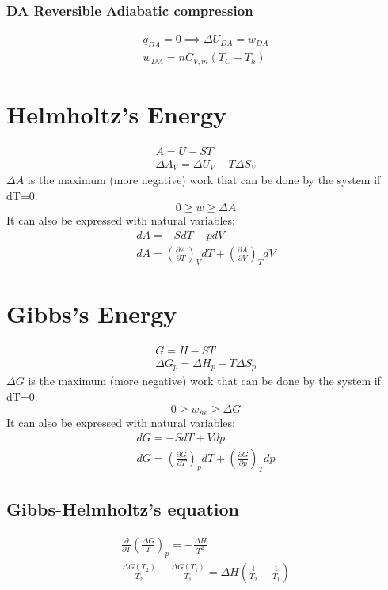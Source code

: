 \documentclass[Master.tex]{subfiles}
\begin{document}
\begin{multicols}{2}
				   \subsubsection{DA Reversible Adiabatic compression}
						    \begin{gather*}
								     q_{DA} = 0 \implies \Delta U_{DA} = w_{DA}\\
								     w_{DA} = nC_{V,m}(T_{C}-T_{h})
						    \end{gather*}

		 \section{Helmholtz's Energy}
		  \begin{gather*}
				   A = U - ST \\
				   \Delta A_{V}  = \Delta U_{V}  - T \Delta S_{V}
		  \end{gather*}
		  $\Delta A$ is the maximum (more negative) work that can be done by the system if dT=0.
		  $$ 0 \geq w \geq \Delta A $$
		  It can also be expressed with natural variables:
		  \begin{gather*}
				   dA = -SdT - pdV \\
				   dA = \left(\frac{\partial A}{\partial T}\right)_{V} dT + \left(\frac{\partial A}{\partial V}\right) _{T}dV
		  \end{gather*}

		 \section{Gibbs's Energy}
		  \begin{gather*}
				   G = H - ST\\
				   \Delta G_{p}  = \Delta H_{p}  - T\Delta S_{p}
		  \end{gather*}
		  $\Delta G$ is the maximum (more negative) work that can be done by the system if dT=0.
		  \[
				   0 \geq w_{ne} \geq \Delta G
		  \]
		  It can also be expressed with natural variables:
		  \begin{gather*}
				   dG = -SdT + Vdp\\
				   dG = \left( \frac{\partial G}{\partial T} \right)_{p}dT + \left( \frac{\partial G}{\partial p} \right)_{T}dp
		  \end{gather*}
		  \subsection{Gibbs-Helmholtz's equation}
				   \begin{gather*}
						    \frac{\partial }{\partial T} \left( \frac{\Delta G}{T} \right) _{p} = -\frac{\Delta H}{T^{2} }\\
								     \frac{\Delta G(T_2)}{T_2} - \frac{\Delta G(T_1)}{T_{1} } = \Delta H \left(
								     \frac{1}{T_2}-\frac{1}{T_1} \right)
				   \end{gather*}

\end{multicols}
\end{document}
